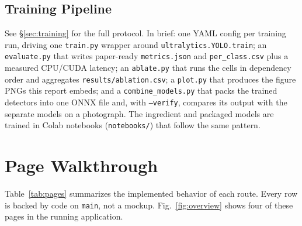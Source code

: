 \documentclass[journal]{IEEEtran}
\begin{document}
\subsection{Training Pipeline}
See \S\ref{sec:training} for the full protocol. In brief: one YAML
config per training run, driving one \texttt{train.py} wrapper
around \texttt{ultralytics.YOLO.train}; an \texttt{evaluate.py} that
writes paper-ready \texttt{metrics.json} and \texttt{per\_class.csv}
plus a measured CPU/CUDA latency; an \texttt{ablate.py} that runs
the cells in dependency order and aggregates
\texttt{results/ablation.csv}; a \texttt{plot.py} that produces
the figure PNGs this report embeds; and a \texttt{combine\_models.py}
that packs the trained detectors into one ONNX file and, with
\texttt{--verify}, compares its output with the separate models on a
photograph. The ingredient and packaged models are trained in Colab
notebooks (\texttt{notebooks/}) that follow the same pattern.

\section{Page Walkthrough}
\label{sec:pages}

Table~\ref{tab:pages} summarizes the implemented behavior of each
route. Every row is backed by code on \texttt{main}, not a mockup.
Fig.~\ref{fig:overview} shows four of these pages in the running
application.
\end{document}
